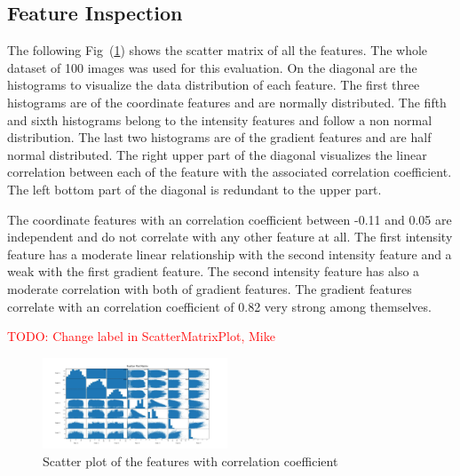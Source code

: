 \documentclass[journal]{IEEEtran}
\newcommand\TODO[1]{\textcolor{red}{TODO: #1}}
\begin{document}
\subsection{Feature Inspection}



The following Fig~(\ref{scatterplot}) shows the scatter matrix of all the features. The whole dataset of 100 images was used for this evaluation. On the diagonal are the histograms to visualize the data distribution of each feature. The first three histograms are of the coordinate features and are normally distributed. The fifth and sixth histograms belong to the intensity features and follow a non normal distribution. The last two histograms are of the gradient features and are half normal distributed. The right upper part of the diagonal visualizes the linear correlation between each of the feature with the associated correlation coefficient. The left bottom part of the diagonal is redundant to the upper part. 

The coordinate features with an correlation coefficient between -0.11 and 0.05 are independent and do not correlate with any other feature at all. The first intensity feature has a moderate linear relationship with the second intensity feature and a weak with the first gradient feature. The second intensity feature has also a moderate correlation with both of gradient features. The gradient features correlate with an correlation coefficient of 0.82 very strong among themselves.    

\TODO{Change label in ScatterMatrixPlot, Mike}

\begin{figure}[h]
	\centering
	\includegraphics[width=0.49\textwidth]{images/ScatterPlotMatrix}
	\caption{Scatter plot of the features with correlation coefficient}
	\label{scatterplot}
\end{figure}
\end{document}
